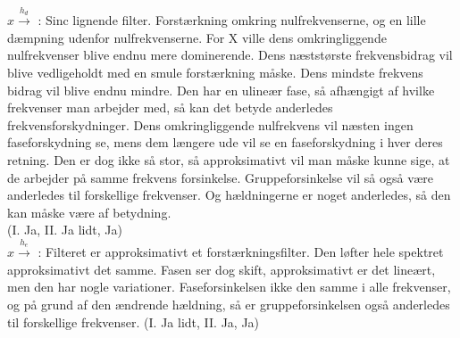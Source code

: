 \begin{Opgaver}
\begin{kapitel}
\begin{Opgave}
            $x \overset{h_d}{\rightarrow}$ : Sinc lignende filter. Forstærkning omkring nulfrekvenserne, og en lille dæmpning udenfor nulfrekvenserne.
            For X ville dens omkringliggende nulfrekvenser blive endnu mere dominerende. Dens næststørste frekvensbidrag vil blive vedligeholdt med en smule forstærkning måske. 
            Dens mindste frekvens bidrag vil blive endnu mindre. 
            Den har en ulineær fase, så afhængigt af hvilke frekvenser man arbejder med, så kan det betyde anderledes frekvensforskydninger. 
            Dens omkringliggende nulfrekvens vil næsten ingen faseforskydning se, mens dem længere ude vil se en faseforskydning i hver deres retning. Den er dog ikke så stor, så approksimativt vil man måske kunne sige, at de arbejder på samme frekvens forsinkelse. 
            Gruppeforsinkelse vil så også være anderledes til forskellige frekvenser. Og hældningerne er noget anderledes, så den kan måske være af betydning.\\
            (I. Ja, II. Ja lidt, Ja)\\

            $x \overset{h_e}{\rightarrow}$ : Filteret er approksimativt et forstærkningsfilter. Den løfter hele spektret approksimativt det samme. 
            Fasen ser dog skift, approksimativt er det lineært, men den har nogle variationer. Faseforsinkelsen ikke den samme i alle frekvenser, og på grund af den ændrende hældning, så er gruppeforsinkelsen også anderledes til forskellige frekvenser.
            (I. Ja lidt, II. Ja, Ja)\\\\


\end{Opgave}
\end{kapitel}
\end{Opgaver}
